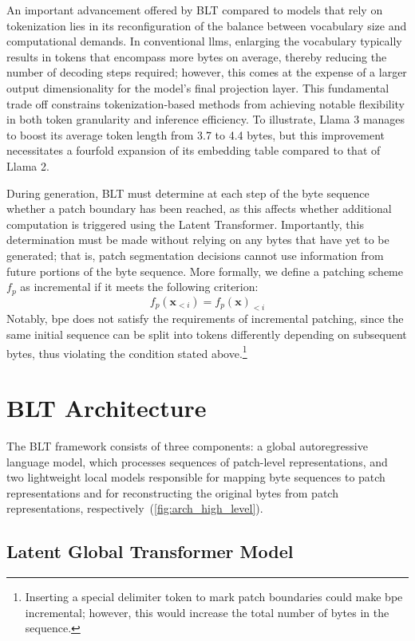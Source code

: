 An important advancement offered by {\textsc BLT} compared to models that rely on tokenization lies in its reconfiguration of the balance between vocabulary size and computational demands. In conventional llms, enlarging the vocabulary typically results in tokens that encompass more bytes on average, thereby reducing the number of decoding steps required; however, this comes at the expense of a larger output dimensionality for the model’s final projection layer. This fundamental trade off constrains tokenization-based methods from achieving notable flexibility in both token granularity and inference efficiency. To illustrate, Llama 3 manages to boost its average token length from 3.7 to 4.4 bytes, but this improvement necessitates a fourfold expansion of its embedding table compared to that of Llama 2.

During generation, {\textsc BLT} must determine at each step of the byte sequence whether a patch boundary has been reached, as this affects whether additional computation is triggered using the Latent Transformer. Importantly, this determination must be made without relying on any bytes that have yet to be generated; that is, patch segmentation decisions cannot use information from future portions of the byte sequence. More formally, we define a patching scheme $f_p$ as incremental if it meets the following criterion:
$$f_p(\pmb{x}_{<i}) = f_p(\pmb{x})_{<i}$$
Notably, bpe does not satisfy the requirements of incremental patching, since the same initial sequence can be split into tokens differently depending on subsequent bytes, thus violating the condition stated above.\footnote{Inserting a special delimiter token to mark patch boundaries could make bpe incremental; however, this would increase the total number of bytes in the sequence.}

\section{{\textsc BLT} Architecture}
\label{section:architecture}
The {\textsc BLT} framework consists of three components: a global autoregressive language model, which processes sequences of patch-level representations, and two lightweight local models responsible for mapping byte sequences to patch representations and for reconstructing the original bytes from patch representations, respectively~(\autoref{fig:arch_high_level}).

\subsection{Latent Global Transformer Model}


